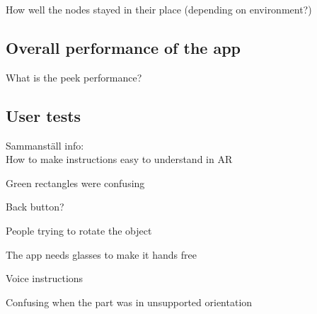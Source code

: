 How well the nodes stayed in their place (depending on environment?)

\subsection{Overall performance of the app}

What is the peek performance?

\subsection{User tests}

Sammanställ info: \\

How to make instructions easy to understand in AR

Green rectangles were confusing

Back button?

People trying to rotate the object

The app needs glasses to make it hands free

Voice instructions

Confusing when the part was in unsupported orientation








\newpage